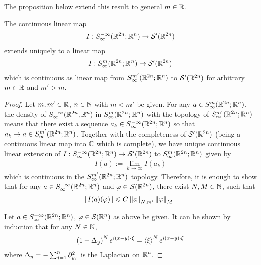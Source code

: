 \documentclass[12pt]{article}
\begin{document}
The proposition below extend this result to general $m \in \R$. 
\begin{fprop}
    The continuous linear map 
    \begin{align*}
        I : S^{-\infty}_\infty(\R^{2n}; \R^n) \to \sch'(\R^{2n}) \\
    \end{align*}
    extends uniquely to a linear map 
    \begin{align*}
        I: S^{m}_\infty(\R^{2n}; \R^n) \to \sch'(\R^{2n})
    \end{align*}
    which is continuous as linear map from $S^{m'}_\infty(\R^{2n}; \R^n)$ to $\sch'(\R^{2n})$ for arbitrary $m \in \R$ and $m ' > m$. 
\end{fprop}
\begin{proof}
    Let $m, m' \in \R$, $n \in \N$ with $m < m' $ be given. For any $a \in S^{m}_\infty(\R^{2n}; \R^n)$, the density of $S^{-\infty}_\infty(\R^{2n}; \R^n)$ in  $S^{m}_\infty(\R^{2n}; \R^n)$ with the topology of $S^{m'}_\infty(\R^{2n}; \R^n)$ means that there exist a sequence $a_k \in S^{-\infty}_\infty(\R^{2n}; \R^n)$ so that $a_k \to a \in S^{m'}_\infty(\R^{2n}; \R^n)$. Together with the completeness of $\sch'(\R^{2n})$ (being a continuous linear map into $\C$ which is complete), we have unique continuous linear extension of $I : S^{-\infty}_\infty(\R^{2n}; \R^n) \to \sch'(\R^{2n})$ to $S^{m}_\infty(\R^{2n}; \R^n)$ given by
    \begin{align*}
        I(a) := \lim_{k \to \infty}I(a_k)
    \end{align*}
    which is continuous in the $S^{m'}_\infty(\R^{2n}; \R^n)$ topology. Therefore, it is enough to show that for any $a \in S^{-\infty}_\infty(\R^{2n}; \R^n) $ and $\varphi \in \sch(\R^{2n})$, there exist $N, M \in \N$, such that 
    \begin{align*}
        \abs{I(a)(\varphi)} \leq C \norm[a]_{N, m'} \norm[\varphi]_M. 
    \end{align*}
    
    Let $a \in S^{-\infty}_{\infty}(\R^{2n}; \R^{n})$, $\varphi \in \sch(\R^n)$ as above be given. It can be shown by induction that for any $N \in \N$,  
    \begin{align*}
    \brac{1 + \Delta_y}^N e^{i (x - y) \cdot \xi} = \sym[\xi]^{N}e^{i (x - y) \cdot \xi}
    \end{align*}
    where $\Delta_y = - \sum_{j = 1}^n \p_{y_j}^2$ is the Laplacian on $\R^n$. 


\end{proof}
\end{document}
